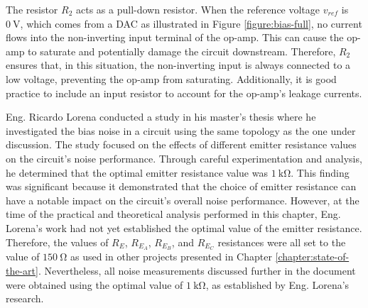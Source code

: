 The resistor $R_2$ acts as a pull-down resistor. When the reference voltage $v_{ref}$ is $\mathrm{0~V}$, which comes from a \ac{DAC} as illustrated in Figure \ref{figure:bias-full}, no current flows into the non-inverting input terminal of the op-amp. This can cause the op-amp to saturate and potentially damage the circuit downstream. Therefore, $R_2$ ensures that, in this situation, the non-inverting input is always connected to a low voltage, preventing the op-amp from saturating. Additionally, it is good practice to include an input resistor to account for the op-amp's leakage currents.

Eng. Ricardo Lorena conducted a study in his master's thesis \cite{RicardoL_thesis} where he investigated the bias noise in a circuit using the same topology as the one under discussion. The study focused on the effects of different emitter resistance values on the circuit's noise performance. Through careful experimentation and analysis, he determined that the optimal emitter resistance value was $\mathrm{1~k\Omega}$. This finding was significant because it demonstrated that the choice of emitter resistance can have a notable impact on the circuit's overall noise performance. However, at the time of the practical and theoretical analysis performed in this chapter, Eng. Lorena's work had not yet established the optimal value of the emitter resistance. Therefore, the values of $R_E$, $R_{E_{A}}$, $R_{E_{B}}$, and $R_{E_{C}}$ resistances were all set to the value of $\mathrm{150~\Omega}$ as used in other projects presented in Chapter \ref{chapter:state-of-the-art}. Nevertheless, all noise measurements discussed further in the document were obtained using the optimal value of $\mathrm{1~k\Omega}$, as established by Eng. Lorena's research.

